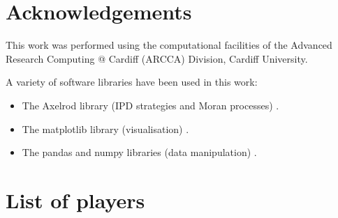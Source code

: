 \documentclass{article}
\begin{document}
\section*{Acknowledgements}

This work was performed using the computational facilities of the Advanced
Research Computing @ Cardiff (ARCCA) Division, Cardiff University.

A variety of software libraries have been used in this work:

\begin{itemize}
    \item The Axelrod library (IPD strategies and Moran processes)
        \cite{axelrodproject}.
    \item The matplotlib library (visualisation) \cite{hunter2007matplotlib}.
    \item The pandas and numpy libraries (data manipulation)
        \cite{mckinney2010data, walt2011numpy}.
\end{itemize}

\printbibliography

\appendix

\section{List of players}\label{app:list_of_players}

\begin{multicols}{3}
	\begin{enumerate}
		
	\end{enumerate}
\end{multicols}
\end{document}
